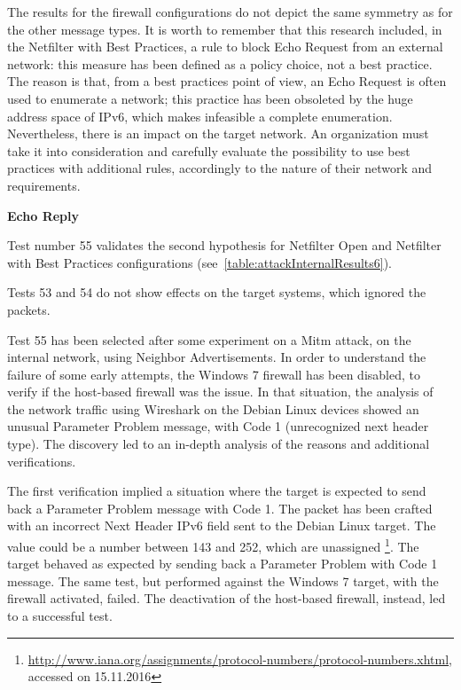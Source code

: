 \documentclass[12pt]{article}
\begin{document}
The results for the firewall configurations do not depict the same symmetry as for the other message types. It is worth to remember that this research included, in the Netfilter with Best Practices, a rule to block Echo Request from an external network: this measure has been defined as a policy choice, not a best practice. The reason is that, from a best practices point of view, an Echo Request is often used to enumerate a network; this practice has been obsoleted by the huge address space of IPv6, which makes infeasible a complete enumeration. Nevertheless, there is an impact on the target network. An organization must take it into consideration and carefully evaluate the possibility to use best practices with additional rules, accordingly to the nature of their network and requirements.

\textbf{Echo Reply}

Test number 55 validates the second hypothesis for Netfilter Open and Netfilter with Best Practices configurations (see~\cref{table:attackInternalResults6}).

Tests 53 and 54 do not show effects on the target systems, which ignored the packets.

Test 55 has been selected after some experiment on a Mitm attack, on the internal network, using Neighbor Advertisements. In order to understand the failure of some early attempts, the Windows 7 firewall has been disabled, to verify if the host-based firewall was the issue.  In that situation, the analysis of the network traffic using Wireshark on the Debian Linux devices showed an unusual Parameter Problem message, with Code 1 (unrecognized next header type). The discovery led to an in-depth analysis of the reasons and additional verifications.

The first verification implied a situation where the target is expected to send back a Parameter Problem message with Code 1. The packet has been crafted with an incorrect Next Header IPv6 field sent to the Debian Linux target. The value could be a number between 143 and 252, which are unassigned \footnote{\url{http://www.iana.org/assignments/protocol-numbers/protocol-numbers.xhtml}, accessed on 15.11.2016}. The target behaved as expected by sending back a Parameter Problem with Code 1 message. The same test, but performed against the Windows 7 target, with the firewall activated, failed. The deactivation of the host-based firewall, instead, led to a successful test. 
\end{document}
